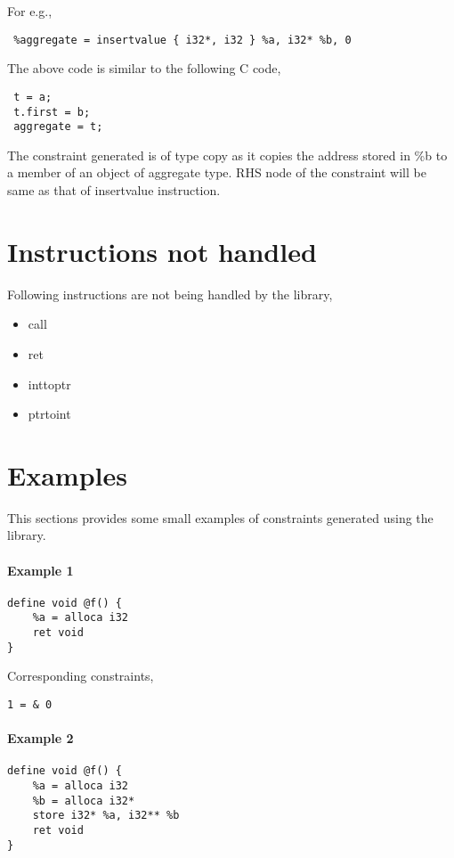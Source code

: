 \documentclass[a4paper,11pt]{report}
\begin{document}
For e.g.,

\begin{lstlisting}
 %aggregate = insertvalue { i32*, i32 } %a, i32* %b, 0
\end{lstlisting}

The above code is similar to the following C code,

\begin{lstlisting}
 t = a;
 t.first = b;
 aggregate = t;
\end{lstlisting}

The constraint generated is of type copy as it copies the address stored in \%b 
to a member of an object of aggregate type. RHS node of the constraint will be 
same as that of insertvalue instruction.

\section{Instructions not handled}
Following instructions are not being handled by the library,

\begin{itemize}
    \item call
    \item ret
    \item inttoptr
    \item ptrtoint
\end{itemize}

\section{Examples}
This sections provides some small examples of constraints generated using the
library.

\paragraph{Example 1}

\begin{verbatim}
define void @f() {
    %a = alloca i32
    ret void
}
\end{verbatim}

Corresponding constraints,
\begin{lstlisting}
1 = & 0
\end{lstlisting}

\paragraph{Example 2}
\begin{verbatim}
define void @f() {
    %a = alloca i32
    %b = alloca i32*
    store i32* %a, i32** %b
    ret void
}
\end{verbatim}
\end{document}
